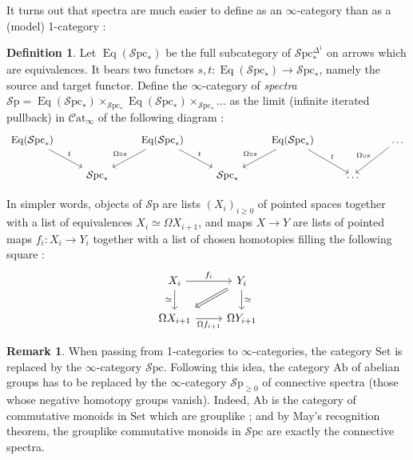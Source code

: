 \documentclass[11pt]{article}
\theoremstyle{definition}
\newtheorem{definition}{Definition}
\newtheorem{remark}{Remark}
\newcommand{\Catinf}{\mathcal{C}\mathrm{at}_{\infty}}
\newcommand{\Eq}{\operatorname{Eq}}
\newcommand{\Set}{\mathrm{Set}}
\newcommand{\Sp}{\mathcal{S}\mathrm{p}}
\newcommand{\Spc}{\mathcal{S}\mathrm{pc}}
\begin{document}
It turns out that spectra are much easier to define as an $\infty$-category than as a (model) 1-category :
\begin{definition}
    Let $\Eq(\Spc_*)$ be the full subcategory of $\Spc_*^{\Delta^1}$ on arrows which are equivalences.
    It bears two functors $s, t : \Eq(\Spc_*) \to \Spc_*$, namely the source and target functor.
    Define the $\infty$-category of \emph{spectra} $\Sp = \Eq(\Spc_*) \times_{\Spc_*} \Eq(\Spc_*) \times_{\Spc_*} \dots$ as the limit (infinite iterated pullback) in $\Catinf$ of the following diagram :
    \[\begin{tikzcd}
        {\Eq(\Spc_*)} && {\Eq(\Spc_*)} && {\Eq(\Spc_*)} && \dots \\
        & {\Spc_*} && {\Spc_*} && \dots
        \arrow["t", from=1-1, to=2-2]
        \arrow["{\Omega \circ s}"', from=1-3, to=2-2]
        \arrow["t", from=1-3, to=2-4]
        \arrow["{\Omega \circ s}"', from=1-5, to=2-4]
        \arrow["t", from=1-5, to=2-6]
        \arrow["{\Omega \circ s}"', from=1-7, to=2-6]
    \end{tikzcd}\]
\end{definition}
In simpler words, objects of $\Sp$ are lists $(X_i)_{i \geq 0}$ of pointed spaces together with a list of equivalences $X_i \simeq \Omega X_{i+1}$, and maps $X \to Y$ are lists of pointed maps $f_i : X_i \to Y_i$ together with a list of chosen homotopies filling the following square :
\[\begin{tikzcd}
	{X_i} & {Y_i} \\
	{\Omega X_{i+1}} & {\Omega Y_{i+1}}
	\arrow["{f_i}", from=1-1, to=1-2]
	\arrow["\simeq"', from=1-1, to=2-1]
	\arrow[shorten <=4pt, shorten >=4pt, Rightarrow, from=1-2, to=2-1]
	\arrow["\simeq", from=1-2, to=2-2]
	\arrow["{\Omega f_{i+1}}"', from=2-1, to=2-2]
\end{tikzcd}\]

\begin{remark}
    When passing from 1-categories to $\infty$-categories, the category $\Set$ is replaced by the $\infty$-category $\Spc$.
    Following this idea, the category $\mathrm{Ab}$ of abelian groups has to be replaced by the $\infty$-category $\Sp_{\geqslant 0}$ of connective spectra (those whose negative homotopy groups vanish).
    Indeed, $\mathrm{Ab}$ is the category of commutative monoids in $\Set$ which are grouplike ; and by May's recognition theorem, the grouplike commutative monoids in $\Spc$ are exactly the connective spectra.
\end{remark}
\end{document}
